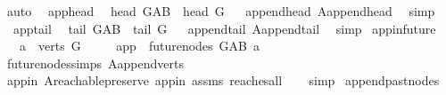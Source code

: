 \begin{isabellebody}
\ auto%
\endisatagproof
{\isafoldproof}%
%
\isadelimproof
%
\endisadelimproof
\isanewline
\isanewline
\isanewline
{}\isamarkupfalse%
\ \ app{}{\isacharunderscore}{\kern0pt}head{\isacharcolon}{\kern0pt}\isanewline
\ \ {\isachardoublequoteopen}head\ G{\isacharunderscore}{\kern0pt}AB\ {\isacharequal}{\kern0pt}\ head\ G{\isachardoublequoteclose}%
\isadelimproof
\ %
\endisadelimproof
%
\isatagproof
{}\isamarkupfalse%
\ append{\isacharunderscore}{\kern0pt}head\ A{}{\isachardot}{\kern0pt}append{\isacharunderscore}{\kern0pt}head\ \isamarkupfalse%
\ simp%
\endisatagproof
{\isafoldproof}%
%
\isadelimproof
%
\endisadelimproof
\isanewline
\isanewline
{}\isamarkupfalse%
\ \ app{}{\isacharunderscore}{\kern0pt}tail{\isacharcolon}{\kern0pt}\isanewline
\ \ {\isachardoublequoteopen}tail\ G{\isacharunderscore}{\kern0pt}AB\ {\isacharequal}{\kern0pt}\ tail\ G{\isachardoublequoteclose}%
\isadelimproof
\ %
\endisadelimproof
%
\isatagproof
{}\isamarkupfalse%
\ append{\isacharunderscore}{\kern0pt}tail\ A{}{\isachardot}{\kern0pt}append{\isacharunderscore}{\kern0pt}tail\ \isamarkupfalse%
\ simp%
\endisatagproof
{\isafoldproof}%
%
\isadelimproof
%
\endisadelimproof
\isanewline
\isanewline
{}\isamarkupfalse%
\ app{\isacharunderscore}{\kern0pt}in{\isacharunderscore}{\kern0pt}future{}{\isacharcolon}{\kern0pt}\ \isanewline
\ \ \ {\isachardoublequoteopen}a\ {\isasymin}\ verts\ G{\isachardoublequoteclose}\ \ \isanewline
\ \ \ {\isachardoublequoteopen}app\ {\isasymin}\ future{\isacharunderscore}{\kern0pt}nodes\ G{\isacharunderscore}{\kern0pt}AB\ a{\isachardoublequoteclose}\isanewline
%
\isadelimproof
\ \ %
\endisadelimproof
%
\isatagproof
{}\isamarkupfalse%
\ future{\isacharunderscore}{\kern0pt}nodes{\isachardot}{\kern0pt}simps\ A{}{\isachardot}{\kern0pt}append{\isacharunderscore}{\kern0pt}verts\isanewline
\ \ \isamarkupfalse%
\ app{\isacharunderscore}{\kern0pt}in\ A{}{\isachardot}{\kern0pt}reachable{}{\isacharunderscore}{\kern0pt}preserve\ app{\isacharunderscore}{\kern0pt}in{}\ assms\ reaches{\isacharunderscore}{\kern0pt}all\isanewline
\ \ \isamarkupfalse%
\ simp%
\endisatagproof
{\isafoldproof}%
%
\isadelimproof
\isanewline
%
\endisadelimproof
\isanewline
{}\isamarkupfalse%
\ append{\isacharunderscore}{\kern0pt}past{\isacharunderscore}{\kern0pt}nodes{}{\isacharcolon}{\kern0pt}\isanewline

\end{isabellebody}
